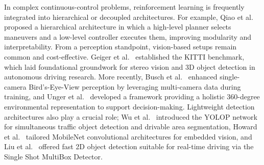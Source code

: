 \documentclass[]{interact}
\begin{document}
In complex continuous-control problems, reinforcement learning is frequently integrated into hierarchical or decoupled architectures. For example, Qiao et al.~\cite{qiao2020hierarchical} proposed a hierarchical architecture in which a high-level planner selects maneuvers and a low-level controller executes them, improving modularity and interpretability. From a perception standpoint, vision-based setups remain common and cost-effective. Geiger et al.~\cite{geiger2012kitti} established the KITTI benchmark, which laid foundational groundwork for stereo vision and 3D object detection in autonomous driving research. More recently, Busch et al.~\cite{busch2023improved} enhanced single-camera Bird's-Eye-View perception by leveraging multi-camera data during training, and Unger et al.~\cite{unger2023multicamera} developed a framework providing a holistic 360-degree environmental representation to support decision-making. Lightweight detection architectures also play a crucial role; Wu et al.~\cite{wu2022yolop} introduced the YOLOP network for simultaneous traffic object detection and drivable area segmentation, Howard et al.~\cite{howard2017mobilenets} tailored MobileNet convolutional architectures for embedded vision, and Liu et al.~\cite{liu2016ssd} offered fast 2D object detection suitable for real-time driving via the Single Shot MultiBox Detector.
\end{document}
